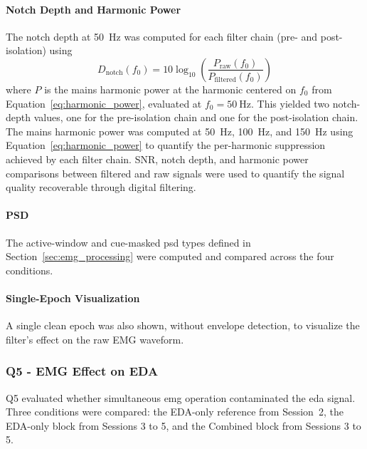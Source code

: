 \paragraph{Notch Depth and Harmonic Power} 
The notch depth at \SI{50}{\hertz} was computed for each filter chain (pre- and post-isolation) using
\begin{equation}
    D_\text{notch}(f_0) = 10\log_{10}\!\left(\frac{P_\text{raw}(f_0)}{P_\text{filtered}(f_0)}\right)
    \label{eq:notch_depth}
\end{equation}
where $P$ is the mains harmonic power at the harmonic centered on $f_0$ from Equation~\ref{eq:harmonic_power}, evaluated at $f_0 = \SI{50}{\hertz}$. This yielded two notch-depth values, one for the pre-isolation chain and one for the post-isolation chain. The mains harmonic power was computed at \SI{50}{\hertz}, \SI{100}{\hertz}, and \SI{150}{\hertz} using Equation~\ref{eq:harmonic_power} to quantify the per-harmonic suppression achieved by each filter chain. SNR, notch depth, and harmonic power comparisons between filtered and raw signals were used to quantify the signal quality recoverable through digital filtering.

\paragraph{PSD}
The active-window and cue-masked \gls{psd} types defined in Section~\ref{sec:emg_processing} were computed and compared across the four conditions.

\paragraph{Single-Epoch Visualization}
A single clean epoch was also shown, without envelope detection, to visualize the filter's effect on the raw EMG waveform.

\subsubsection{Q5 - EMG Effect on EDA}
\label{sec:q5_emg_effect_on_eda}

Q5 evaluated whether simultaneous \gls{emg} operation contaminated the \gls{eda} signal. Three conditions were compared: the EDA-only reference from Session~2, the EDA-only block from Sessions 3 to 5, and the Combined block from Sessions 3 to 5.

